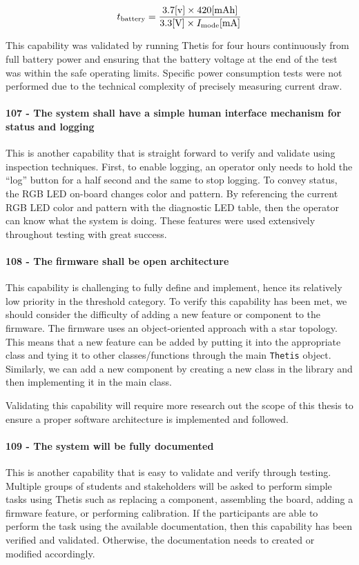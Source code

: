 \begin{equation} \labeq{battery_life}
    t_{\text{battery}} = \frac{3.7 [\text{v}] \times 420 [\text{mAh}]}{3.3 [\text{V}] \times I_{\text{mode}} [\text{mA}]}
\end{equation}

This capability was validated by running Thetis for four hours continuously from full battery power and ensuring that the battery voltage at the end of the test was within the safe operating limits.
Specific power consumption tests were not performed due to the technical complexity of precisely measuring current draw.

\paragraph*{107 - The system shall have a simple human interface mechanism for status and logging} This is another capability that is straight forward to verify and validate using inspection techniques.
First, to enable logging, an operator only needs to hold the ``log'' button for a half second and the same to stop logging.
To convey status, the RGB LED on-board changes color and pattern.
By referencing the current RGB LED color and pattern with the diagnostic LED table, then the operator can know what the system is doing.
These features were used extensively throughout testing with great success.

\paragraph*{108 - The firmware shall be open architecture} This capability is challenging to fully define and implement, hence its relatively low priority in the threshold category.
To verify this capability has been met, we should consider the difficulty of adding a new feature or component to the firmware.
The firmware uses an object-oriented approach with a star topology.
This means that a new feature can be added by putting it into the appropriate class and tying it to other classes/functions through the main \lstinline[style=customInline]|Thetis| object.
Similarly, we can add a new component by creating a new class in the library and then implementing it in the main class.

Validating this capability will require more research out the scope of this thesis to ensure a proper software architecture is implemented and followed.

\paragraph*{109 - The system will be fully documented} This is another capability that is easy to validate and verify through testing.
Multiple groups of students and stakeholders will be asked to perform simple tasks using Thetis such as replacing a component, assembling the board, adding a firmware feature, or performing calibration.
If the participants are able to perform the task using the available documentation, then this capability has been verified and validated.
Otherwise, the documentation needs to created or modified accordingly.

